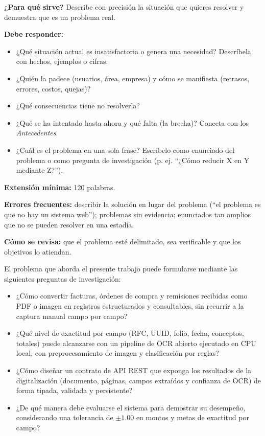 \begin{guia}
\textbf{¿Para qué sirve?} Describe con precisión la situación que quieres resolver y demuestra que es un problema real.

\textbf{Debe responder:}
\begin{itemize}[nosep,leftmargin=*]
  \item ¿Qué situación actual es insatisfactoria o genera una necesidad? Descríbela con hechos, ejemplos o cifras.
  \item ¿Quién la padece (usuarios, área, empresa) y cómo se manifiesta (retrasos, errores, costos, quejas)?
  \item ¿Qué consecuencias tiene no resolverla?
  \item ¿Qué se ha intentado hasta ahora y qué falta (la brecha)? Conecta con los \emph{Antecedentes}.
  \item ¿Cuál es el problema en una sola frase? Escríbelo como enunciado del problema o como pregunta de
        investigación (p. ej. ``¿Cómo reducir X en Y mediante Z?'').
\end{itemize}

\textbf{Extensión mínima:} 120 palabras.

\textbf{Errores frecuentes:} describir la solución en lugar del problema (``el problema es que no hay un sistema web'');
problemas sin evidencia; enunciados tan amplios que no se pueden resolver en una estadía.

\textbf{Cómo se revisa:} que el problema esté delimitado, sea verificable y que los objetivos lo atiendan.
\end{guia}

El problema que aborda el presente trabajo puede formularse mediante las siguientes preguntas de investigación:
\begin{itemize}
    \item ¿Cómo convertir facturas, órdenes de compra y remisiones recibidas como PDF o imagen en registros estructurados y consultables, sin recurrir a la captura manual campo por campo?
    \item ¿Qué nivel de exactitud por campo (RFC, UUID, folio, fecha, conceptos, totales) puede alcanzarse con un pipeline de OCR abierto ejecutado en CPU local, con preprocesamiento de imagen y clasificación por reglas?
    \item ¿Cómo diseñar un contrato de API REST que exponga los resultados de la digitalización (documento, páginas, campos extraídos y confianza de OCR) de forma tipada, validada y persistente?
    \item ¿De qué manera debe evaluarse el sistema para demostrar su desempeño, considerando una tolerancia de $\pm 1.00$ en montos y metas de exactitud por campo?
\end{itemize}

